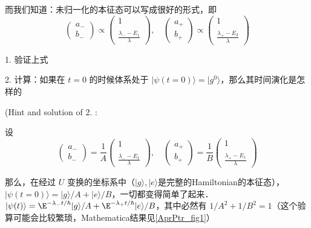 \begin{exercise}{}
而我们知道：未归一化的本征态可以写成很好的形式，即
\begin{equation}
\left(\begin{matrix}a_-\\b_-\end{matrix}\right) \propto \left(\begin{matrix}1 \\ \ \\ \displaystyle\frac{\lambda_- - E_1}{\lambda}\end{matrix}\right),\quad \left(\begin{matrix}a_+\\b_+\end{matrix}\right) \propto \left(\begin{matrix}1 \\ \ \\ \displaystyle\frac{\lambda_+ - E_2}{\lambda}\end{matrix}\right)
\end{equation}

1. 验证上式

2. 计算：如果在 $t=0$ 的时候体系处于 $|\psi(t=0)\rangle = |g^0\rangle$，那么其时间演化是怎样的

(Hint and solution of 2. :

设
\begin{equation}
\left(\begin{matrix}a_-\\b_-\end{matrix}\right) =\frac{1}{A} \left(\begin{matrix}1 \\ \ \\ \displaystyle\frac{\lambda_- - E_1}{\lambda}\end{matrix}\right),\quad \left(\begin{matrix}a_+\\b_+\end{matrix}\right) =\frac{1}{B} \left(\begin{matrix}1 \\ \ \\ \displaystyle\frac{\lambda_+ - E_1}{\lambda}\end{matrix}\right) 
\end{equation}

那么，在经过 $U$ 变换的坐标系中（$|g\rangle,|e\rangle$是完整的Hamiltonian的本征态），$|\psi(t=0)\rangle = |g\rangle/A + |e\rangle/B$，一切都变得简单了起来． $|\psi(t)\rangle = \E^{-\lambda_-t/\hbar}|g\rangle/A + \E^{-\lambda_+t/\hbar}|e\rangle/B$，其中必然有 $1/A^2 + 1/B^2 = 1$（这个验算可能会比较繁琐，Mathematica结果见\autoref{AprPtr_fig1}）


\end{exercise}
